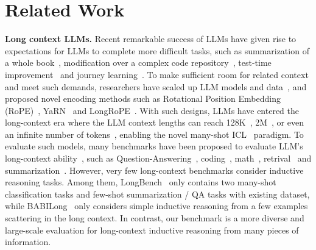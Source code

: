 \section{Related Work}
\textbf{Long context LLMs.} Recent remarkable success of LLMs have given rise to expectations for LLMs to complete more difficult tasks, such as summarization of a whole book~\citep{chang2023booookscore}, modification over a complex code repository~\citep{jimenez2023swe}, test-time improvement~\citep{zhou2023language} and journey learning~\citep{qin2024o1}. To make sufficient room for related context and meet such demands, researchers have scaled up LLM models and data~\citep{zhang2024scaling, pearce2024scaling}, and proposed novel encoding methods such as Rotational Position Embedding (RoPE)~\citep{su2024roformer}, YaRN~\citep{peng2023yarn} and LongRoPE~\citep{ding2024longrope}. With such designs, LLMs have entered the long-context era where the LLM context lengths can reach 128K~\citep{hurst2024gpt, yang2024qwen2technicalreport, dubey2024llama}, 2M~\citep{team2024gemini}, or even an infinite number of tokens~\citep{munkhdalai2024leave}, enabling the novel many-shot ICL~\citep{agarwal2024many} paradigm.
To evaluate such models, many benchmarks have been proposed to evaluate LLM's long-context ability~\citep{wang2024loong, li2023loogle, zhang2024infty}, such as Question-Answering~\citep{shaham2023zeroscrolls, li2023loogle}, coding~\citep{zhang2024infty, dong2023bamboo}, math~\citep{an2023eval, zhang2024infty}, retrival~\citep{niah, hsieh2024ruler, wang2024loong} and summarization~\citep{shaham2023zeroscrolls, an2023eval}. However, very few long-context benchmarks consider inductive reasoning tasks. Among them, LongBench~\citep{bai2023longbench} only contains two many-shot classification tasks and few-shot summarization / QA tasks with existing dataset, while BABILong~\citep{kuratov2024babilong} only considers simple inductive reasoning from a few examples scattering in the long context. In contrast, our benchmark is a more diverse and large-scale evaluation for long-context inductive reasoning from many pieces of information.

